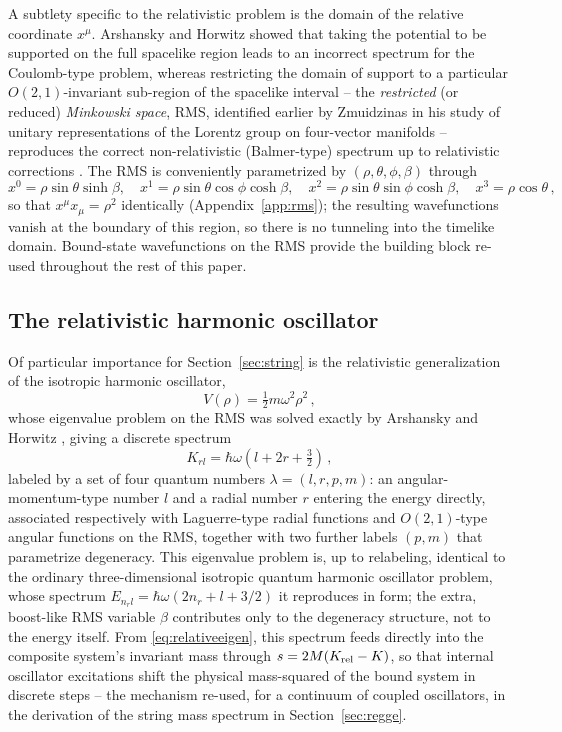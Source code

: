 \documentclass[11pt]{article}
\begin{document}
A subtlety specific to the relativistic problem is the domain of the relative
coordinate $x^\mu$. Arshansky and Horwitz showed that taking the potential to
be supported on the full spacelike region leads to an incorrect spectrum for
the Coulomb-type problem, whereas restricting the domain of support to a
particular $O(2,1)$-invariant sub-region of the spacelike interval -- the
\emph{restricted} (or reduced) \emph{Minkowski space}, RMS, identified earlier
by Zmuidzinas in his study of unitary representations of the Lorentz group on
four-vector manifolds \cite{Zmuidzinas1966} -- reproduces the correct
non-relativistic (Balmer-type) spectrum up to relativistic corrections
\cite{ArshanskyHorwitz1989}. The RMS is conveniently parametrized by
$(\rho,\theta,\phi,\beta)$ through
\begin{equation}
x^0=\rho\sin\theta\sinh\beta,\quad
x^1=\rho\sin\theta\cos\phi\cosh\beta,\quad
x^2=\rho\sin\theta\sin\phi\cosh\beta,\quad
x^3=\rho\cos\theta\,,
\label{eq:RMSparam}
\end{equation}
so that $x^\mu x_\mu=\rho^2$ identically (Appendix~\ref{app:rms}); the
resulting wavefunctions vanish at the boundary of this region, so there is no
tunneling into the timelike domain. Bound-state wavefunctions on the RMS
provide the building block re-used throughout the rest of this paper.

\subsection{The relativistic harmonic oscillator}
\label{sec:oscillator}

Of particular importance for Section~\ref{sec:string} is the relativistic
generalization of the isotropic harmonic oscillator,
\begin{equation}
V(\rho)=\tfrac{1}{2}m\omega^2\rho^2\,,
\label{eq:oscpotential}
\end{equation}
whose eigenvalue problem on the RMS was solved exactly by Arshansky and
Horwitz \cite{ArshanskyHorwitz1989}, giving a discrete spectrum
\begin{equation}
K_{rl}=\hbar\omega\left(l+2r+\tfrac{3}{2}\right)\,,
\label{eq:oscspectrum}
\end{equation}
labeled by a set of four quantum numbers $\lambda=(l,r,p,m)$: an
angular-momentum-type number $l$ and a radial number $r$ entering the energy
directly, associated respectively with Laguerre-type radial functions and
$O(2,1)$-type angular functions on the RMS, together with two further labels
$(p,m)$ that parametrize degeneracy. This eigenvalue problem is, up to
relabeling, identical to the ordinary three-dimensional isotropic quantum
harmonic oscillator problem, whose spectrum $E_{n_rl}=\hbar\omega(2n_r+l+3/2)$
it reproduces in form; the extra, boost-like RMS variable $\beta$ contributes
only to the degeneracy structure, not to the energy itself. From
\eqref{eq:relativeeigen}, this spectrum feeds directly into the composite
system's invariant mass through $s=2M(K_{\rm rel}-K)$, so that internal
oscillator excitations shift the physical mass-squared of the bound system in
discrete steps -- the mechanism re-used, for a continuum of coupled
oscillators, in the derivation of the string mass spectrum in
Section~\ref{sec:regge}.
\end{document}
